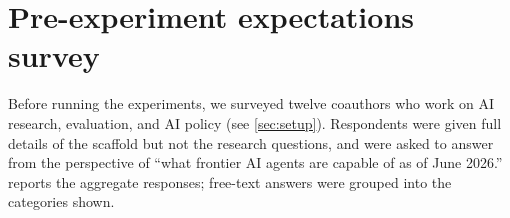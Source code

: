 


\section{Pre-experiment expectations survey}
\label{app:survey}

Before running the experiments, we surveyed twelve coauthors who work on AI
research, evaluation, and AI policy (see \cref{sec:setup}). Respondents were
given full details of the scaffold but not the research questions, and were
asked to answer from the perspective of ``what frontier AI agents are capable
of as of June 2026.''  reports the aggregate responses;
free-text answers were grouped into the categories shown.

